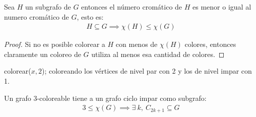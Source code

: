 \begin{lemma}\label{chi_subgrafo}
Sea $H$ un subgrafo de $G$ entonces el número cromático de $H$ es menor o igual al numero cromático de $G$, esto es:
    \begin{align}
        H \subseteq G \implies \chi(H) \le \chi(G)
    \end{align}
\end{lemma}
\begin{proof}
Si no es posible colorear a $H$ con menos de $\chi(H)$ colores, entonces claramente un coloreo de $G$ utiliza al menos esa cantidad de colores.
\end{proof}

\begin{algorithm}
\begin{algorithmic}
    \State colorear($x, 2$);
    \State {} coloreando los vértices de nivel par con 2 y los de nivel impar con 1.
    \EndFor
    \EndFunction
\end{algorithmic}
\end{algorithm}

\begin{lemma}\label{3colores_cicloimpar}
Un grafo $3$-coloreable tiene a un grafo ciclo impar como subgrafo:
\begin{align}
    3 \le \chi(G) \implies \exists~ k,~ C_{2k+1} \subseteq G 
\end{align}
\end{lemma}


